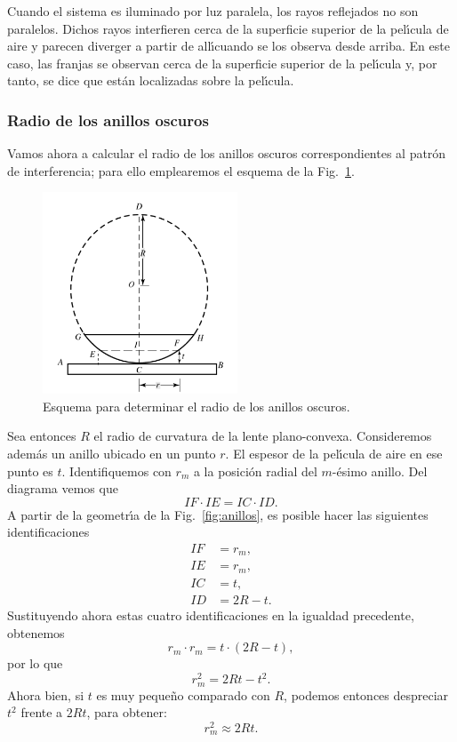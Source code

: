 \documentclass[a4paper]{article}
\begin{document}
Cuando el sistema es iluminado por luz paralela, los rayos reflejados no son
paralelos. Dichos rayos interfieren cerca de la superficie superior de la 
pel\'\i cula de aire y parecen diverger a partir de all\'\i   cuando se los 
observa desde arriba. En este caso, las franjas se observan cerca de la
superficie superior de la pel\'\i cula y, por tanto, se dice que est\'an 
localizadas sobre la pel\'\i cula.

\subsubsection{Radio de los anillos oscuros}

Vamos ahora a calcular el radio de los anillos oscuros correspondientes al
patr\'on de interferencia; para ello emplearemos el esquema de la 
Fig.~\ref{fig:anillos2}.

\begin{figure}[ht]
\centering
\includegraphics[height=6cm]{anillos2.png}
\caption{Esquema para determinar el radio de los anillos oscuros.}
\label{fig:anillos2}
\end{figure}

Sea entonces $R$ el radio de curvatura de la lente plano-convexa. Consideremos
adem\'as un anillo ubicado en un punto $r$. El espesor de la 
pel\'\i cula de aire en ese punto es $t$. Identifiquemos con $r_m$ a la 
posici\'on radial del $m$-\'esimo anillo. Del diagrama vemos que
\begin{equation*}
IF \cdot IE = IC \cdot ID.
\end{equation*}
A partir de la geometr\'\i a de la Fig.~\ref{fig:anillos}, es posible 
hacer las siguientes identificaciones
\begin{align*}
    IF &= r_m, \\
    IE &= r_m, \\
    IC &= t, \\ 
    ID &= 2R - t.
\end{align*}
Sustituyendo ahora estas cuatro identificaciones en la igualdad precedente,
obtenemos
\begin{equation*}
r_m \cdot r_m = t \cdot (2R - t), 
\end{equation*}
por lo que 
\begin{equation*}
r_m^2 = 2Rt - t^2.
\end{equation*}
Ahora bien, si $t$ es muy peque\~no comparado con $R$, podemos entonces
despreciar $t^2$ frente a $2Rt$, para obtener:
\begin{equation*}
    r_m^2 \approx 2 R t.
\end{equation*}
\end{document}
